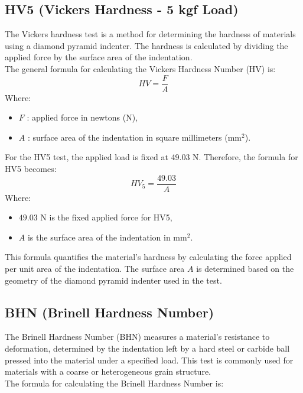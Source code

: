 \documentclass{article}
\begin{document}
\subsection{HV5 (Vickers Hardness - 5 kgf Load)}
The Vickers hardness test is a method for determining the hardness of materials using a diamond pyramid indenter. The hardness is calculated by dividing the applied force by the surface area of the indentation.\\[1em]
The general formula for calculating the Vickers Hardness Number (HV) is:
\begin{equation}
    HV = \frac{F}{A}
\end{equation}
Where:
\begin{itemize}[itemsep=-1mm]
    \item \( F \) : applied force in newtons (N),
    \item \( A \) : surface area of the indentation in square millimeters (mm\(^2\)).
\end{itemize}
For the HV5 test, the applied load is fixed at 49.03 N. Therefore, the formula for HV5 becomes:
\begin{equation}
    HV_5 = \frac{49.03}{A}
\end{equation}
Where:
\begin{itemize}[itemsep=-1mm]
    \item \( 49.03 \) N is the fixed applied force for HV5,
    \item \( A \) is the surface area of the indentation in mm\(^2\).
\end{itemize}
This formula quantifies the material's hardness by calculating the force applied per unit area of the indentation. The surface area \( A \) is determined based on the geometry of the diamond pyramid indenter used in the test.
\subsection{BHN (Brinell Hardness Number)}
The Brinell Hardness Number (BHN) measures a material's resistance to deformation, determined by the indentation left by a hard steel or carbide ball pressed into the material under a specified load. This test is commonly used for materials with a coarse or heterogeneous grain structure.\\[1em]
The formula for calculating the Brinell Hardness Number is:
\end{document}
